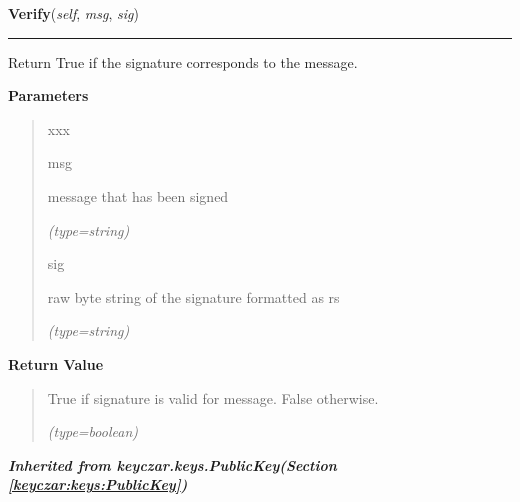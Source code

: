     \label{keyczar:keys:DsaPublicKey:Verify}

    \vspace{0.5ex}

\hspace{.8\funcindent}\begin{boxedminipage}{\funcwidth}

    \raggedright \textbf{Verify}(\textit{self}, \textit{msg}, \textit{sig})

    \vspace{-1.5ex}

    \rule{\textwidth}{0.5\fboxrule}
\setlength{\parskip}{2ex}
    Return True if the signature corresponds to the message.

\setlength{\parskip}{1ex}
      \textbf{Parameters}
      \vspace{-1ex}

      \begin{quote}
        \begin{Ventry}{xxx}

          \item[msg]

          message that has been signed

            {\it (type=string)}

          \item[sig]

          raw byte string of the signature formatted as r{\textbar}s

            {\it (type=string)}

        \end{Ventry}

      \end{quote}

      \textbf{Return Value}
    \vspace{-1ex}

      \begin{quote}
      True if signature is valid for message. False otherwise.

      {\it (type=boolean)}

      \end{quote}

    \end{boxedminipage}


\large{\textbf{\textit{Inherited from keyczar.keys.PublicKey\textit{(Section \ref{keyczar:keys:PublicKey})}}}}

